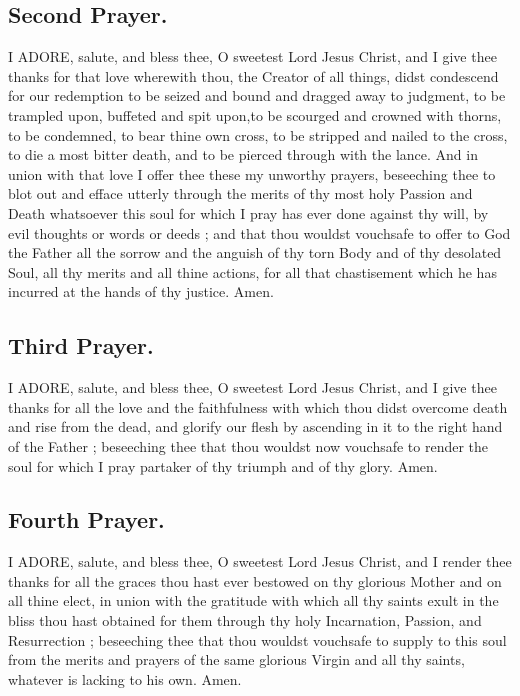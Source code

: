 \documentclass[a5paper,12pt]{memoir}
\begin{document}
\subsection{Second Prayer.} 

I ADORE, salute, and 
bless thee, O sweetest Lord Jesus Christ, 
and I give thee thanks 
for that love wherewith thou, the Creator 
of all things, didst 
condescend for our 
redemption to be seized and bound and 
dragged away to judgment, to be trampled 
upon, buffeted and 
spit upon,to be scourged and crowned with 
thorns, to be condemned, to bear thine own 
cross, to be stripped 
and nailed to the cross, 
to die a most bitter 
death, and to be pierced through with the 
lance. And in union 
with that love I offer 
thee these my unworthy prayers, beseeching thee to blot out and 
efface utterly through 
the merits of thy most 
holy Passion and Death 
whatsoever this soul 
for which I pray has 
ever done against thy 
will, by evil thoughts 
or words or deeds ; 
and that thou wouldst 
vouchsafe to offer to 
God the Father all the 
sorrow and the anguish of thy torn Body 
and of thy desolated 
Soul, all thy merits 
and all thine actions, 
for all that chastisement which he has incurred at the hands of 
thy justice. Amen. 

\subsection{Third Prayer.}

I ADORE, salute, and 
bless thee, O sweetest Lord Jesus Christ, 
and I give thee thanks 
for all the love and 
the faithfulness with 
which thou didst overcome death and rise 
from the dead, and 
glorify our flesh by 
ascending in it to the 
right hand of the Father ; beseeching thee 
that thou wouldst now 
vouchsafe to render 
the soul for which I 
pray partaker of thy 
triumph and of thy 
glory. Amen. 

\subsection{Fourth Prayer.}

I ADORE, salute, 
and bless thee, O 
sweetest Lord Jesus 
Christ, and I render 
thee thanks for all 
the graces thou hast 
ever bestowed on thy 
glorious Mother and 
on all thine elect, in 
union with the gratitude with which all 
thy saints exult in the 
bliss thou hast obtained for them through 
thy holy Incarnation, 
Passion, and Resurrection ; beseeching 
thee that thou wouldst 
vouchsafe to supply 
to this soul from the 
merits and prayers of 
the same glorious Virgin and all thy saints, 
whatever is lacking to 
his own. Amen. 
\end{document}
